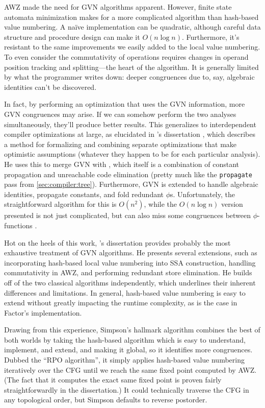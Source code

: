 AWZ made the need for \gls{GVN} algorithms apparent.  However, finite state
automata minimization makes for a more complicated algorithm than hash-based
value numbering.  A na\"{i}ve implementation can be quadratic, although careful
data structure and procedure design can make it $O(n\log n)$.  Furthermore,
it's resistant to the same improvements we easily added to the local value
numbering.  To even consider the commutativity of operations requires changes
in operand position tracking and splitting---the heart of the algorithm.  It is
generally limited by what the programmer writes down: deeper congruences due
to, say, algebraic identities can't be discovered.

In fact, by performing an optimization that uses the \gls{GVN} information,
more \gls{GVN} congruences may arise.  If we can somehow perform the two
analyses simultaneously, they'll produce better results.  This generalizes to
interdependent compiler optimizations at large, as elucidated in
\citeauthor{Click}'s dissertation \autocite*{Click}, which describes a method
for formalizing and combining separate optimizations that make optimistic
assumptions (whatever they happen to be for each particular analysis).  He uses
this to merge \gls{GVN} with , which
itself is a combination of constant propagation and unreachable code
elimination (pretty much like the \Verb|propagate| pass from
\cref{sec:compiler:tree}).  Furthermore, \gls{GVN} is extended to handle
algebraic identities, propagate constants, and fold redundant $\phi$s.
Unfortunately, the straightforward algorithm for this is $O(n^2)$, while the
$O(n\log n)$ version presented is not just complicated, but can also miss some
congruences between $\phi$-functions \autocites{Click,Simpson}.

Hot on the heels of this work, \citeauthor{Simpson}'s \autocite*{Simpson}
dissertation provides probably the most exhaustive treatment of \gls{GVN}
algorithms.  He presents several extensions, such as incorporating hash-based
local value numbering into \gls{SSA} construction, handling commutativity in
AWZ, and performing redundant store elimination.  He builds off of the two
classical algorithms independently, which underlines their inherent differences
and limitations.  In general, hash-based value numbering is easy to extend
without greatly impacting the runtime complexity, as is the case in Factor's
implementation.

Drawing from this experience, Simpson's hallmark algorithm combines the best of
both worlds by taking the hash-based algorithm which is easy to understand,
implement, and extend, and making it global, so it identifies more congruences.
Dubbed the ``\gls{RPO} algorithm'', it simply applies hash-based value
numbering iteratively over the \gls{CFG} until we reach the same fixed point
computed by AWZ.  (The fact that it computes the exact same fixed point is
proven fairly straightforwardly in the dissertation.)  It could technically
traverse the \gls{CFG} in any topological order, but Simpson defaults to
reverse postorder.

